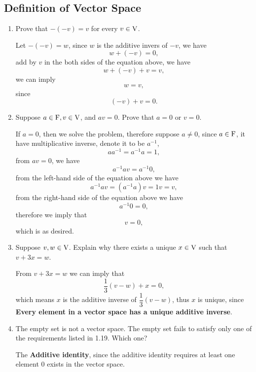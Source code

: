\subsection{Definition of Vector Space}

\begin{enumerate}
    \item Prove that $-(-v) = v$ for every $v \in \mathrm{V}$.
        \begin{solution}
            Let $-(-v) = w$, since $w$ is the additive invers of $-v$, we have 
            \[ w + (-v) = 0,\]
            add by $v$ in the both sides of the equation above, we have 
            \[ w + (-v) + v = v,\]
            we can imply 
            \[ w = v ,\]
            since
            \[ (-v) + v = 0.\]
        \end{solution}
    \item Suppose $a \in \mathrm{F}, v \in \mathrm{V}$, and $av = 0$. Prove that $a=0$ or $v=0$.
        \begin{solution}
            If $a = 0$, then we solve the problem, therefore suppose $a \neq 0$, since $a \in \mathrm{F}$, it have multiplicative inverse, 
            denote it to be $a^{-1}$, \ie 
            \[ a a^{-1} = a^{-1}a =  1,\]
            from $av = 0$, we have 
            \[ a^{-1}av = a^{-1}0, \]
            from the left-hand side of the equation above we have 
            \[ a^{-1}av = (a^{-1}a)v = 1v = v,\]
            from the right-hand side of the equation above we have 
            \[ a^{-1}0 = 0,\]
            therefore we imply that 
            \[ v = 0,\]
            which is as desired.
        \end{solution}
    \item Suppose $v,w \in \mathrm{V}$. Explain why there exists a unique $x \in \mathrm{V}$ such that $v + 3x = w$.
        \begin{solution}  
            From $v + 3x = w$ we can imply that 
            \[ \dfrac{1}{3}(v-w) + x = 0,\]
            which means $x$ is the additive inverse of $\dfrac{1}{3}(v-w)$, thus $x$ is unique, since 
            \textbf{Every element in a vector space has a unique additive inverse}.
        \end{solution}
    \item The empty set is not a vector space. The empty set fails to satisfy only one of the requirements 
        listed in 1.19. Which one?
        \begin{solution}
            The \textbf{Additive identity}, since the additive identity requires at least one element $0$ exists in the vector space.

\end{solution}
\end{enumerate}
